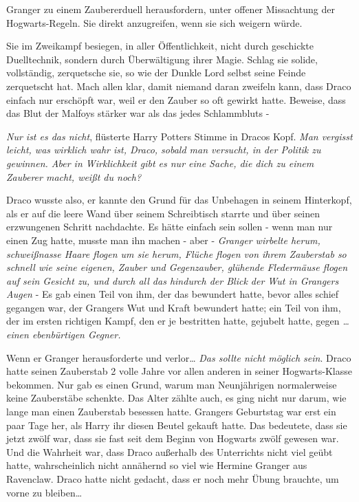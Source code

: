{Granger zu einem Zaubererduell herausfordern, unter offener Missachtung der Hogwarts-Regeln. Sie direkt anzugreifen, wenn sie sich weigern würde.

Sie im Zweikampf besiegen, in aller Öffentlichkeit, nicht durch geschickte Duelltechnik, sondern durch Überwältigung ihrer Magie. Schlag sie solide, vollständig, zerquetsche sie, so wie der Dunkle Lord selbst seine Feinde zerquetscht hat. Mach allen klar, damit niemand daran zweifeln kann, dass Draco einfach nur erschöpft war, weil er den Zauber so oft gewirkt hatte. Beweise, dass das Blut der Malfoys stärker war als das jedes Schlammbluts -

\emph{Nur ist es das nicht}, flüsterte Harry Potters Stimme in Dracos Kopf. \emph{Man vergisst leicht, was wirklich wahr ist, Draco, sobald man versucht, in der Politik zu gewinnen. Aber in Wirklichkeit gibt es nur eine Sache, die dich zu einem Zauberer macht, weißt du noch?}

Draco wusste also, er kannte den Grund für das Unbehagen in seinem Hinterkopf, als er auf die leere Wand über seinem Schreibtisch starrte und über seinen erzwungenen Schritt nachdachte. Es hätte einfach sein sollen - wenn man nur einen Zug hatte, musste man ihn machen - aber - \emph{Granger wirbelte herum, schweißnasse Haare flogen um sie herum, Flüche flogen von ihrem Zauberstab so schnell wie seine eigenen, Zauber und Gegenzauber, glühende Fledermäuse flogen auf sein Gesicht zu, und durch all das hindurch der Blick der Wut in Grangers Augen} - Es gab einen Teil von ihm, der das bewundert hatte, bevor alles schief gegangen war, der Grangers Wut und Kraft bewundert hatte; ein Teil von ihm, der im ersten richtigen Kampf, den er je bestritten hatte, gejubelt hatte, gegen \emph{… einen ebenbürtigen Gegner.}

Wenn er Granger herausforderte und verlor… \emph{Das sollte nicht möglich sein}. Draco hatte seinen Zauberstab 2 volle Jahre vor allen anderen in seiner Hogwarts-Klasse bekommen. Nur gab es einen Grund, warum man Neunjährigen normalerweise keine Zauberstäbe schenkte. Das Alter zählte auch, es ging nicht nur darum, wie lange man einen Zauberstab besessen hatte. Grangers Geburtstag war erst ein paar Tage her, als Harry ihr diesen Beutel gekauft hatte. Das bedeutete, dass sie jetzt zwölf war, dass sie fast seit dem Beginn von Hogwarts zwölf gewesen war. Und die Wahrheit war, dass Draco außerhalb des Unterrichts nicht viel geübt hatte, wahrscheinlich nicht annähernd so viel wie Hermine Granger aus Ravenclaw. Draco hatte nicht gedacht, dass er noch mehr Übung brauchte, um vorne zu bleiben…

}
